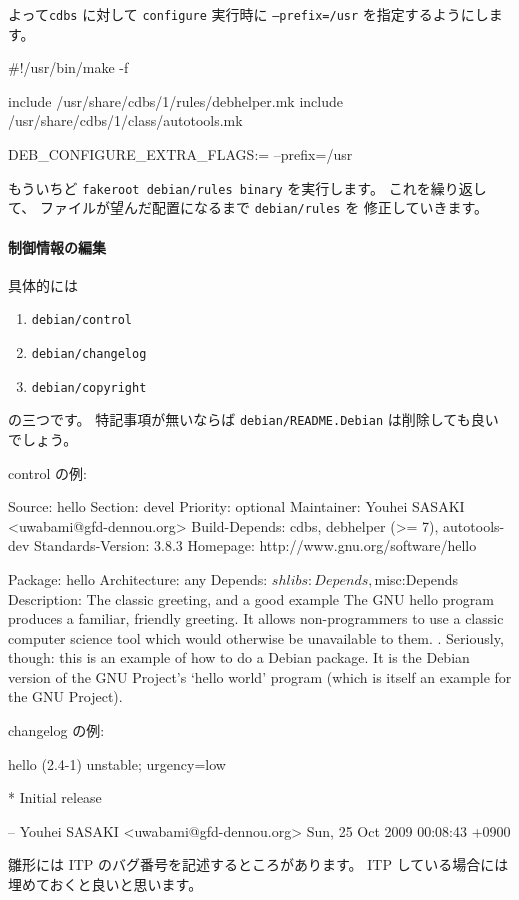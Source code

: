 \documentclass[mingoth,a4paper]{jsarticle}
\begin{document}
よって{\tt cdbs} に対して {\tt configure} 実行時に {\tt --prefix=/usr}
を指定するようにします。

\begin{commandline}
#!/usr/bin/make -f

include /usr/share/cdbs/1/rules/debhelper.mk
include /usr/share/cdbs/1/class/autotools.mk

DEB_CONFIGURE_EXTRA_FLAGS:= --prefix=/usr

\end{commandline}
もういちど {\tt fakeroot debian/rules binary} を実行します。
これを繰り返して、 ファイルが望んだ配置になるまで {\tt debian/rules} を
修正していきます。


\paragraph{制御情報の編集}

具体的には 
\begin{enumerate}
      \item {\tt debian/control}
      \item {\tt debian/changelog}
      \item {\tt debian/copyright}
\end{enumerate}
の三つです。
特記事項が無いならば {\tt debian/README.Debian} は削除しても良いでしょう。

control の例:
\begin{commandline}
Source: hello
Section: devel
Priority: optional
Maintainer: Youhei SASAKI <uwabami@gfd-dennou.org>
Build-Depends: cdbs, debhelper (>= 7), autotools-dev
Standards-Version: 3.8.3
Homepage: http://www.gnu.org/software/hello

Package: hello
Architecture: any
Depends: ${shlibs:Depends}, ${misc:Depends}
Description: The classic greeting, and a good example
 The GNU hello program produces a familiar, friendly greeting.  It
 allows non-programmers to use a classic computer science tool which
 would otherwise be unavailable to them.
 .
 Seriously, though: this is an example of how to do a Debian package.
 It is the Debian version of the GNU Project's `hello world' program
 (which is itself an example for the GNU Project).
\end{commandline}

changelog の例:
\begin{commandline}
hello (2.4-1) unstable; urgency=low

  * Initial release

 -- Youhei SASAKI <uwabami@gfd-dennou.org>  Sun, 25 Oct 2009 00:08:43 +0900

\end{commandline}
雛形には ITP のバグ番号を記述するところがあります。
ITP している場合には埋めておくと良いと思います。
\end{document}
